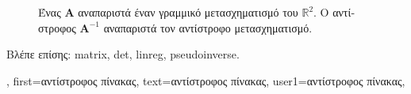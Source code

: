 {{\begin{figure}[H]
			{
 			\caption{\foreignlanguage{greek}{Ένας}  $\mathbf{A}$ \foreignlanguage{greek}{αναπαριστά έναν 
			γραμμικό μετασχηματισμό του $\mathbb{R}^{2}$. Ο αντίστροφος}  $\mathbf{A}^{-1}$ 
			\foreignlanguage{greek}{αναπαριστά τον αντίστροφο μετασχηματισμό.} \label{fig_matrix_inverse_dict}} }
 		\end{figure}
		\foreignlanguage{greek}{Βλέπε επίσης:} \gls{matrix}, \gls{det}, \gls{linreg}, \gls{pseudoinverse}.},
	first={\foreignlanguage{greek}{αντίστροφος πίνακας}},
	text={\foreignlanguage{greek}{αντίστροφος πίνακας}},
	user1={\foreignlanguage{greek}{αντίστροφος πίνακας}}, %
}

